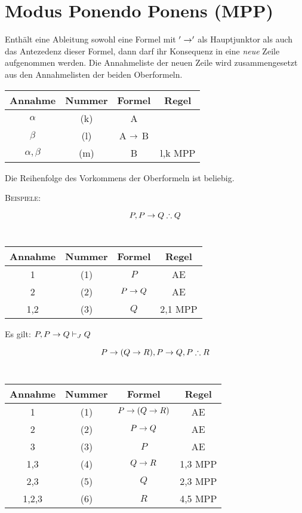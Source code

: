 \documentclass{sajzk}
\begin{document}
\section{Modus Ponendo Ponens (MPP)}
\label{69fy}

Enthält eine Ableitung sowohl eine Formel mit $'\rightarrow'$ als Hauptjunktor als auch
das Antezedenz dieser Formel, dann darf ihr Konsequenz in eine \textit{neue}
Zeile aufgenommen werden. Die Annahmeliste der neuen Zeile wird zusammengesetzt
aus den Annahmelisten der beiden Oberformeln.

\begin{center}
\begin{tabular}{|c|c|c|c|}
  \hline
  Annahme         & Nummer & Formel        & Regel \\
  \hline
  $\alpha$        & (k)    & A             &  \\
  \hline
  $\beta$         & (l)    & A $\rightarrow$ B     &  \\
  \hline
  $\alpha, \beta$ & (m)    & B             & l,k MPP \\
  \hline
\end{tabular}
\end{center}

Die Reihenfolge des Vorkommens der Oberformeln ist beliebig.

\textsc{Beispiele:}
\begin{center}
    \[P, P \rightarrow Q \therefore Q\] \\

\begin{tabular}{|c|c|c|c|}
  \hline
  Annahme      & Nummer & Formel & Regel \\
  \hline
  1   & (1)    & $P$             & AE \\
  \hline
  2   & (2)    & $P \rightarrow Q$       & AE \\
  \hline
  1,2 & (3)    & $Q$             & 2,1 MPP \\
  \hline
\end{tabular}
\end{center}

Es gilt: $P, P \rightarrow Q \vdash_J Q$
\newpage
\begin{center}
    \[P \rightarrow (Q\rightarrow R), P \rightarrow Q, P \therefore R\] \\

\begin{tabular}{|c|c|c|c|}
  \hline
  Annahme        & Nummer & Formel   & Regel \\
  \hline
  1     & (1)    & $P \rightarrow (Q\rightarrow R)$  & AE \\
  \hline
  2     & (2)    & $P \rightarrow Q$         & AE \\
  \hline
  3     & (3)    & $P$               & AE \\
  \hline
  1,3   & (4)    & $Q \rightarrow R$         & 1,3 MPP \\
  \hline
  2,3   & (5)    & $Q$               & 2,3 MPP \\
  \hline
  1,2,3 & (6)    & $R$               & 4,5 MPP \\
  \hline
\end{tabular}
\end{center}
\end{document}
